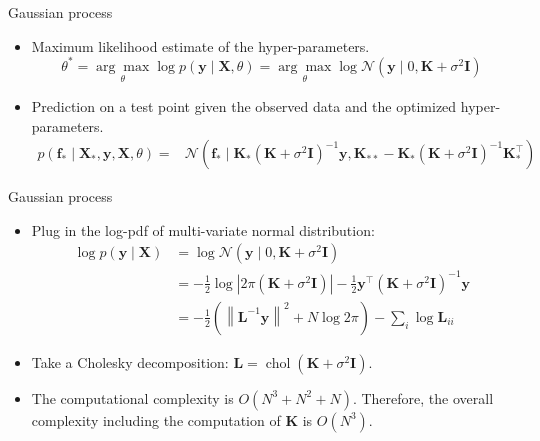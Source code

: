\documentclass{beamer}
\begin{document}
\begin{frame}[fragile]{Gaussian process}
\begin{itemize}
\item Maximum likelihood estimate of the hyper-parameters.
$$
\theta^{*}=\underset{\theta}{\arg \max } \log p(\mathbf{y} \mid \mathbf{X}, \theta)=\underset{\theta}{\arg \max } \log \mathcal{N}\left(\mathbf{y} \mid 0, \mathbf{K}+\sigma^{2} \mathbf{I}\right)
$$
\item Prediction on a test point given the observed data and the optimized hyper-parameters.
$$
\begin{aligned}
	p\left(\mathbf{f}_{*} \mid \mathbf{X}_{*}, \mathbf{y}, \mathbf{X}, \theta\right)= &
	\mathcal{N}\left(\mathbf{f}_{*} \mid \mathbf{K}_{*}\left(\mathbf{K}+\sigma^{2} \mathbf{I}\right)^{-1} \mathbf{y}, \mathbf{K}_{* *}-\mathbf{K}_{*}\left(\mathbf{K}+\sigma^{2} \mathbf{I}\right)^{-1} \mathbf{K}_{*}^{\top}\right)
\end{aligned}
$$		
\end{itemize}
\end{frame}



\begin{frame}[fragile]{Gaussian process}

\begin{itemize}
\item Plug in the log-pdf of multi-variate normal distribution:
$$
\begin{aligned}
	\log p(\mathbf{y} \mid \mathbf{X}) &=\log \mathcal{N}\left(\mathbf{y} \mid 0, \mathbf{K}+\sigma^{2} \mathbf{I}\right) \\
	&=-\frac{1}{2} \log \left|2 \pi\left(\mathbf{K}+\sigma^{2} \mathbf{I}\right)\right|-\frac{1}{2} \mathbf{y}^{\top}\left(\mathbf{K}+\sigma^{2} \mathbf{I}\right)^{-1} \mathbf{y} \\
	&=-\frac{1}{2}\left(\left\|\mathbf{L}^{-1} \mathbf{y}\right\|^{2}+N \log 2 \pi\right)-\sum_{i} \log \mathbf{L}_{i i}
\end{aligned}
$$
\item Take a Cholesky decomposition: $\mathbf{L}=\operatorname{chol}\left(\mathbf{K}+\sigma^{2} \mathbf{I}\right)$.
\item The computational complexity is \textbf{$O\left(N^{3}+N^{2}+N\right)$}. Therefore, the overall complexity including the computation of $\mathbf{K}$ is $O\left(N^{3}\right)$.
\end{itemize}
\end{frame}
\end{document}
